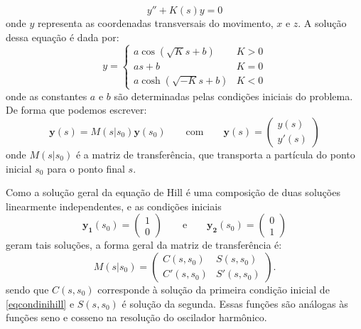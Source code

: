 \begin{equation}\label{eqoscbet}
 y''+K(s)y=0 
\end{equation}
onde $y$ representa as coordenadas transversais do movimento, $x$ e $z$. A solução dessa equação é dada por:
\begin{equation}
 y=\left\{\begin{array}{ll}
           a \cos\left(\sqrt{K}s+b\right) & 	K>0 \\
	   a s +b                      &	K=0 \\
	   a \cosh\left(\sqrt{-K}s+b\right) &	K<0
          \end{array}\right.
\end{equation}
onde as constantes $a$ e $b$ são determinadas pelas condições iniciais do problema. De forma que podemos escrever:
\begin{equation}
 \mathbf{y}(s)=M(s|s_0)\mathbf{y}(s_0)
\qquad \mathrm{com}\qquad 
\mathbf{y}(s) = \left(\begin{array}{c}
			y(s) \\
			y'(s)
		       \end{array}\right)
\end{equation}
onde $M(s|s_0)$ é a matriz de transferência, que transporta a partícula do ponto inicial $s_0$ para o ponto final $s$.

Como a solução geral da equação de Hill é uma composição de duas soluções linearmente independentes, e as condições iniciais
\begin{equation} \label{eqcondinihill}
\mathbf{y_1}(s_0)=\left(\begin{array}{c}
			1 \\
			0
		       \end{array}\right)
\qquad \mathrm{e} \qquad 
\mathbf{y_2}(s_0)=\left(\begin{array}{c}
			0 \\
			1
		       \end{array}\right)
\end{equation}
geram tais soluções, a forma geral da matriz de transferência é:
\begin{equation}\label{eqmatriztransf}
 M(s|s_0)=\left(\begin{array}{cc}
                  C(s,s_0)  &  S(s,s_0) \\
	          C'(s,s_0) &  S'(s,s_0)
		\end{array}\right).
\end{equation}
sendo que $C(s,s_0)$ corresponde à solução da primeira condição inicial de \mbox{\eqref{eqcondinihill}} e $S(s,s_0)$ é solução da segunda. Essas funções são análogas às funções seno e cosseno na resolução do oscilador harmônico.


